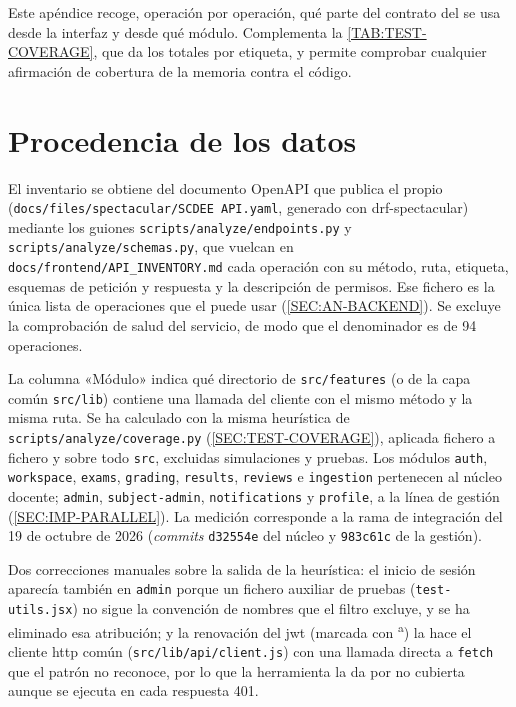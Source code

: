 
Este apéndice recoge, operación por operación, qué parte del contrato del
 se usa desde la interfaz y desde qué módulo. Complementa la
\cref{TAB:TEST-COVERAGE}, que da los totales por etiqueta, y permite comprobar
cualquier afirmación de cobertura de la memoria contra el código.

\section*{Procedencia de los datos}
El inventario se obtiene del documento OpenAPI que publica el propio
 (\texttt{docs/files/spectacular/SCDEE API.yaml}, generado con
drf-spectacular) mediante los guiones \texttt{scripts/analyze/endpoints.py} y
\texttt{scripts/analyze/schemas.py}, que vuelcan en
\texttt{docs/frontend/API\_INVENTORY.md} cada operación con su método, ruta,
etiqueta, esquemas de petición y respuesta y la descripción de permisos. Ese
fichero es la única lista de operaciones que el  puede usar
(\cref{SEC:AN-BACKEND}). Se excluye la comprobación de salud del servicio, de
modo que el denominador es de 94 operaciones.

La columna «Módulo» indica qué directorio de \texttt{src/features} (o de la capa
común \texttt{src/lib}) contiene una llamada del cliente con el mismo método y
la misma ruta. Se ha calculado con la misma heurística de
\texttt{scripts/analyze/coverage.py} (\cref{SEC:TEST-COVERAGE}), aplicada
fichero a fichero y sobre todo \texttt{src}, excluidas simulaciones y pruebas.
Los módulos \texttt{auth}, \texttt{workspace}, \texttt{exams},
\texttt{grading}, \texttt{results}, \texttt{reviews} e \texttt{ingestion}
pertenecen al núcleo docente; \texttt{admin}, \texttt{subject-admin},
\texttt{notifications} y \texttt{profile}, a la línea de gestión
(\cref{SEC:IMP-PARALLEL}). La medición corresponde a la rama de integración
del 19 de octubre de 2026 (\textit{commits} \texttt{d32554e} del núcleo y
\texttt{983c61c} de la gestión).

Dos correcciones manuales sobre la salida de la heurística: el inicio de sesión
aparecía también en \texttt{admin} porque un fichero auxiliar de pruebas
(\texttt{test-utils.jsx}) no sigue la convención de nombres que el filtro
excluye, y se ha eliminado esa atribución; y la renovación del \acs{jwt}
(marcada con \textsuperscript{a}) la hace el cliente \acs{http} común
(\texttt{src/lib/api/client.js}) con una llamada directa a \texttt{fetch} que
el patrón no reconoce, por lo que la herramienta la da por no cubierta aunque
se ejecuta en cada respuesta 401.

